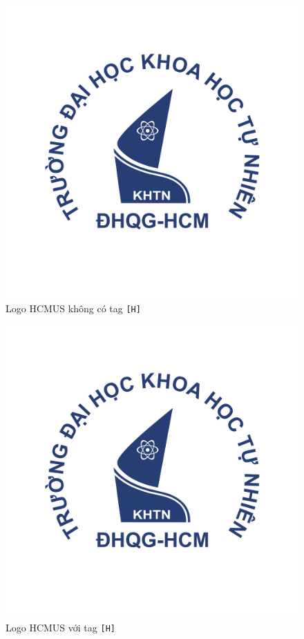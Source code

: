 \begin{figure}
\centering
\includegraphics[scale=.2]{img/hcmus-logo.png}
\caption{Logo HCMUS không có tag \texttt{[H]}}
\label{fig:hcmus-with-no-h}
\end{figure}

\begin{figure}[H]
\centering
\includegraphics[scale=.2]{img/hcmus-logo.png}
\caption{Logo HCMUS với tag \texttt{[H]}}
\label{fig:hcmus-with-h}
\end{figure}

